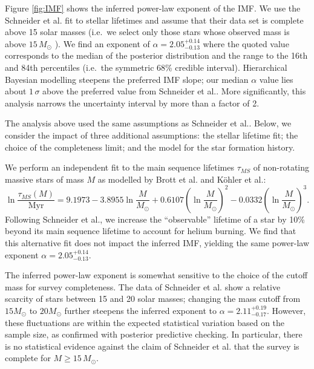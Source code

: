 \documentclass[12pt]{article}
\newcommand{\MSun}{M_\odot}
\newcommand{\onesigrange}[3]{\ensuremath{#1^{+#2}_{-#3}}}
\newcommand{\alpharangeone}{\onesigrange{2.05}{0.14}{0.13}}
\newcommand{\alpharangetwo}{\onesigrange{2.05}{0.14}{0.13}}
\newcommand{\alpharangethree}{\onesigrange{2.11}{0.19}{0.17}}
\begin{document}
Figure \ref{fig:IMF} shows the inferred power-law exponent of the IMF.   We use the Schneider et al.\cite{Schneider:2018} fit to stellar lifetimes and assume
that their data set is complete above 15 solar masses (i.e.\ we select only
those stars whose observed mass is above $15 \, M_\odot$
\cite{Loredo:2004,BBH:O1}).  We find
an exponent of $\alpha=\alpharangeone$ where the quoted value corresponds to the median
of the posterior distribution and the range to the 16th and 84th percentiles
(i.e.\ the symmetric 68\% credible interval).  Hierarchical Bayesian modelling steepens the preferred IMF
slope; our median $\alpha$ value lies about $1\, \sigma$ above the preferred value from
Schneider et al.\cite{Schneider:2018}.  More significantly, this analysis narrows the uncertainty interval by more than a factor of 2.

The analysis above used the same assumptions as Schneider et al.\cite{Schneider:2018}.  Below, we consider the impact of three additional  assumptions: the stellar lifetime fit; the choice of the completeness limit; and the model for the star formation history.

We perform an independent fit to the main sequence lifetimes
$\tau_{MS}$ of non-rotating massive stars of mass $M$ as modelled by Brott et al.\cite{Brott:2011} and K\"{o}hler et al.\cite{Kohler:2015}:
%
\begin{equation}
\ln \frac{\tau_{MS} (M)}{\textrm{Myr}} = 9.1973 - 3.8955 \ln\frac{M}{M_\odot} 
+ 0.6107 \left(\ln\frac{M}{M_\odot} \right)^2 - 0.0332 \left(\ln\frac{M}{M_\odot}\right)^3.
\end{equation}
%
Following Schneider et al.\cite{Schneider:2018}, we increase the ``observable''
lifetime of a star by 10\% beyond its main sequence lifetime to account for
helium burning.  We find that this alternative fit does not impact the inferred IMF, yielding the same power-law exponent $\alpha=\alpharangetwo$.

The inferred power-law exponent is somewhat sensitive to
the choice of the cutoff mass for survey completeness.  The data of Schneider et al.\cite{Schneider:2018} show a relative scarcity of stars between 15 and 20 solar masses; changing the mass cutoff from $15 M_\odot$ to $20 M_\odot$ further steepens the inferred exponent to $\alpha=\alpharangethree$.    However, these fluctuations are within the expected statistical variation based on the sample size, as confirmed with posterior predictive
checking.  In particular, there is no statistical evidence against the claim of Schneider et al.\cite{Schneider:2018} that
the survey is complete for $M \geq 15 \, \MSun$.
\end{document}
